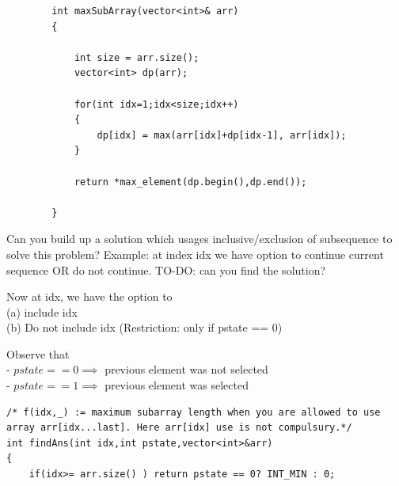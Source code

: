 \begin{solution}
    \begin{verbatim}
        int maxSubArray(vector<int>& arr) 
        {
            
            int size = arr.size();
            vector<int> dp(arr);
            
            for(int idx=1;idx<size;idx++)
            {
                dp[idx] = max(arr[idx]+dp[idx-1], arr[idx]);
            }

            return *max_element(dp.begin(),dp.end());
    
        }
    \end{verbatim}

\end{solution}

\begin{solution}
    Can you build up a solution which usages inclusive/exclusion of subsequence to solve this problem?
    Example: at index idx we have option to continue current sequence OR do not continue.
    TO-DO: can you find the solution?



    Now at idx, we have the option to \\
    (a) include idx\\
    (b) Do not include idx (Restriction: only if pstate == 0)

    Observe that \\
    - $pstate==0 \implies$ previous element was not selected\\
    - $pstate==1 \implies$ previous element was selected


    \begin{minipage}{\textwidth}
    \begin{lstlisting}
/* f(idx,_) := maximum subarray length when you are allowed to use array arr[idx...last]. Here arr[idx] use is not compulsury.*/
int findAns(int idx,int pstate,vector<int>&arr)
{
    if(idx>= arr.size() ) return pstate == 0? INT_MIN : 0; 


\end{lstlisting}
\end{minipage}
\end{solution}
